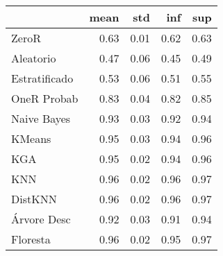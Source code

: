 \begin{table}
\centering
\label{Breast_Cancer_status_table}
\begin{tabular}{lrrrr}
\toprule
{} &  mean &  std &  inf &  sup \\
\midrule
ZeroR         &  0.63 & 0.01 & 0.62 & 0.63 \\
Aleatorio     &  0.47 & 0.06 & 0.45 & 0.49 \\
Estratificado &  0.53 & 0.06 & 0.51 & 0.55 \\
OneR Probab   &  0.83 & 0.04 & 0.82 & 0.85 \\
Naive Bayes   &  0.93 & 0.03 & 0.92 & 0.94 \\
KMeans        &  0.95 & 0.03 & 0.94 & 0.96 \\
KGA           &  0.95 & 0.02 & 0.94 & 0.96 \\
KNN           &  0.96 & 0.02 & 0.96 & 0.97 \\
DistKNN       &  0.96 & 0.02 & 0.96 & 0.97 \\
Árvore Desc   &  0.92 & 0.03 & 0.91 & 0.94 \\
Floresta      &  0.96 & 0.02 & 0.95 & 0.97 \\
\bottomrule
\end{tabular}
\end{table}
